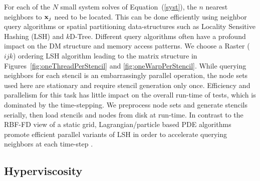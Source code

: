 
For each of the $N$ small system solves of Equation~(\ref{syst}), the $n$ nearest neighbors to $\mathbf{x}_j$ need to be located. This can be done efficiently using neighbor query algorithms or spatial partitioning data-structures such as Locality Sensitive Hashing (LSH) and $k$D-Tree. Different query algorithms often have a profound impact on the DM structure and memory access patterns. We choose a Raster ($ijk$) ordering LSH algorithm \cite{Bollig2011} leading to the matrix structure in Figures~\ref{fig:oneThreadPerStencil} and \ref{fig:oneWarpPerStencil}. While querying neighbors for each stencil is an embarrassingly parallel operation, the node sets used here are stationary and require stencil generation only once. Efficiency and parallelism for this task has little impact on the overall run-time of tests, which is dominated by the time-stepping. We preprocess node sets and generate stencils serially, then load stencils and nodes from disk at run-time. In contrast to the RBF-FD view of a static grid, Lagrangian/particle based PDE algorithms promote efficient parallel variants of LSH in order to accelerate querying neighbors at each time-step \cite{Pan2011, Goswami2010}. 

\subsection{Hyperviscosity}

